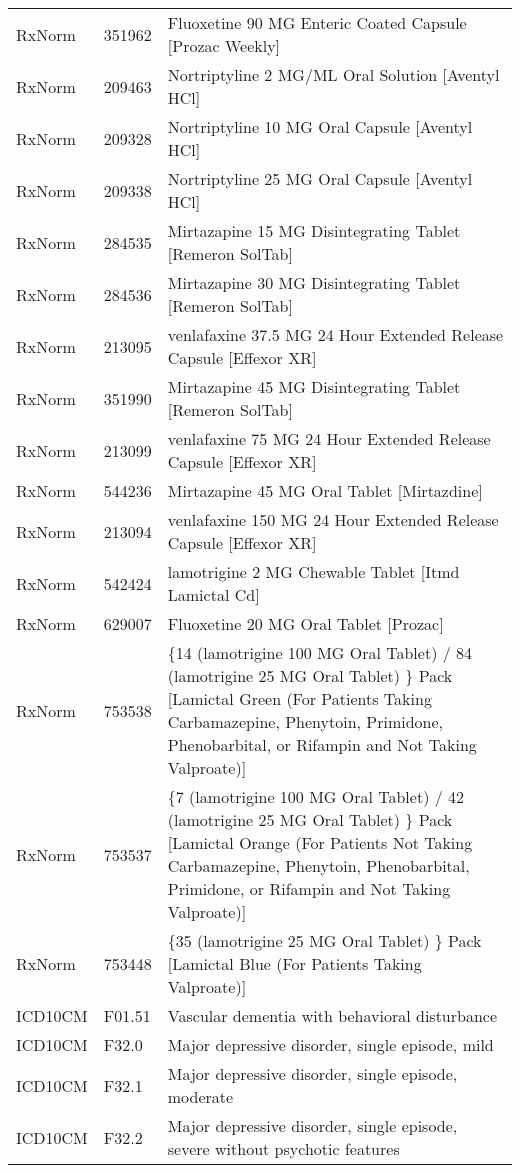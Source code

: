 \begin{longtable}{p{}p{}p{}}
  RxNorm & 351962 & Fluoxetine 90 MG Enteric Coated Capsule [Prozac Weekly] \\ 
  RxNorm & 209463 & Nortriptyline 2 MG/ML Oral Solution [Aventyl HCl] \\ 
  RxNorm & 209328 & Nortriptyline 10 MG Oral Capsule [Aventyl HCl] \\ 
  RxNorm & 209338 & Nortriptyline 25 MG Oral Capsule [Aventyl HCl] \\ 
  RxNorm & 284535 & Mirtazapine 15 MG Disintegrating Tablet [Remeron SolTab] \\ 
  RxNorm & 284536 & Mirtazapine 30 MG Disintegrating Tablet [Remeron SolTab] \\ 
  RxNorm & 213095 & venlafaxine 37.5 MG 24 Hour Extended Release Capsule [Effexor XR] \\ 
  RxNorm & 351990 & Mirtazapine 45 MG Disintegrating Tablet [Remeron SolTab] \\ 
  RxNorm & 213099 & venlafaxine 75 MG 24 Hour Extended Release Capsule [Effexor XR] \\ 
  RxNorm & 544236 & Mirtazapine 45 MG Oral Tablet [Mirtazdine] \\ 
  RxNorm & 213094 & venlafaxine 150 MG 24 Hour Extended Release Capsule [Effexor XR] \\ 
  RxNorm & 542424 & lamotrigine 2 MG Chewable Tablet [Itmd Lamictal Cd] \\ 
  RxNorm & 629007 & Fluoxetine 20 MG Oral Tablet [Prozac] \\ 
  RxNorm & 753538 & \{14 (lamotrigine 100 MG Oral Tablet) / 84 (lamotrigine 25 MG Oral Tablet) \} Pack [Lamictal Green (For Patients Taking Carbamazepine, Phenytoin, Primidone, Phenobarbital, or Rifampin and Not Taking Valproate)] \\ 
  RxNorm & 753537 & \{7 (lamotrigine 100 MG Oral Tablet) / 42 (lamotrigine 25 MG Oral Tablet) \} Pack [Lamictal Orange (For Patients Not Taking Carbamazepine, Phenytoin, Phenobarbital, Primidone, or Rifampin and Not Taking Valproate)] \\ 
  RxNorm & 753448 & \{35 (lamotrigine 25 MG Oral Tablet) \} Pack [Lamictal Blue (For Patients Taking Valproate)] \\ 
  ICD10CM & F01.51 & Vascular dementia with behavioral disturbance \\ 
  ICD10CM & F32.0 & Major depressive disorder, single episode, mild \\ 
  ICD10CM & F32.1 & Major depressive disorder, single episode, moderate \\ 
  ICD10CM & F32.2 & Major depressive disorder, single episode, severe without psychotic features \\ 

\end{longtable}

